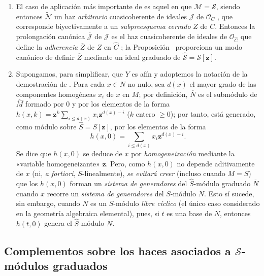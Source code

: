 \documentclass[oneside,10pt]{amsart}
\newcommand{\oldpage}[2][]{\marginnote{\normalfont\footnotesize\textbf{#1}~|~#2}\ignorespaces}
\let\EGAOriginalLabel\label
\renewcommand{\label}[1]{\phantomsection\EGAOriginalLabel{#1}}
\begin{document}
\begin{remark}[8.13.4]
\label{II.8.13.4-fr}
\begin{enumerate}
    \item[\rm{(i)}] El caso de aplicación más importante de  es aquel en que $\mathcal{M}=\mathcal{S}$, siendo entonces $\widetilde{\mathcal{N}}$ un haz \emph{arbitrario} cuasicoherente de ideales $\mathcal{J}$ de $\mathcal{O}_C$ , que corresponde biyectivamente a un \emph{subpreesquema cerrado} $Z$ de $C$.
        Entonces la prolongación canónica $\overline{\mathcal{J}}$ de $\mathcal{J}$ es el haz cuasicoherente de ideales de $\mathcal{O}_{\widehat{C}}$ que define la \emph{adherencia} $\overline{Z}$ de $Z$ en $\widehat{C}$ ;
        la Proposición~ proporciona un modo canónico de definir $\overline{Z}$ mediante un ideal graduado de $\widehat{\mathcal{S}}=\mathcal{S}[\mathbf{z}]$.
    \item[\rm{(ii)}] Supongamos, para simplificar, que $Y$ es afín y adoptemos la notación de la demostración de .
        Para cada $x\in N$ no nulo, sea $d(x)$ el mayor grado de las componentes homogéneas $x_i$ de $x$ en $M$;
        por definición, $\overline{N}$ es el submódulo de $\widehat{M}$ formado por $0$ y por los elementos de la forma $h(x,k)=\mathbf{z}^k\sum_{i\leqslant d(x)}x_i \mathbf{z}^{d(x)-i}$ ($k$ entero $\geqslant0$);
        por tanto, está generado, como módulo sobre $\widehat{S}=S[\mathbf{z}]$, por los elementos de la forma
        \[
    h(x,0)=\sum_{i\leqslant d(x)}x_i \mathbf{z}^{d(x)-i}.
  \]
\oldpage[II]{197}
        Se dice que $h(x,0)$ se deduce de $x$ por \emph{homogeneización} mediante la «variable homogeneizante» $\mathbf{z}$.
        Pero, como $h(x,0)$ no depende aditivamente de $x$ (ni, \emph{a fortiori}, $S$-linealmente), \emph{se evitará creer} (incluso cuando $M=S$) que los $h(x,0)$ forman un \emph{sistema de generadores} del $\widehat{S}$-módulo graduado $\overline{N}$ cuando $x$ recorre un \emph{sistema de generadores} del $S$-módulo $N$.
        Esto sí sucede, sin embargo, cuando $N$ es un $S$-módulo \emph{libre cíclico} (el único caso considerado en la geometría algebraica elemental), pues, si $t$ es una base de $N$, entonces $h(t,0)$ genera el $\widehat{S}$-módulo $\overline{N}$.
\end{enumerate}
\end{remark}


\subsection{Complementos sobre los haces asociados a $\mathcal{S}$-módulos graduados}
\label{subsection:II.8.14-fr}
\end{document}
